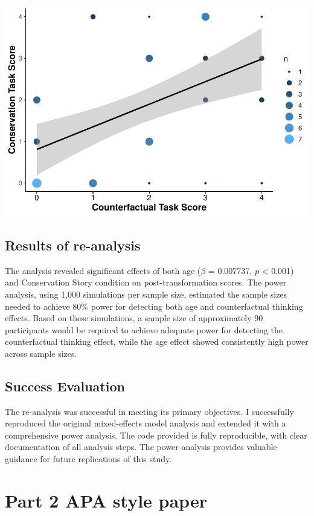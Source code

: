 \documentclass[
  doc]{apa6}
\begin{document}
\includegraphics{final_project_files/figure-latex/unnamed-chunk-8-1.pdf}

\subsection{Results of re-analysis}\label{results-of-re-analysis}

The analysis revealed significant effects of both age (\(\beta\) = 0.007737, \(p\) \textless{} 0.001) and Conservation Story condition on post-transformation scores.
The power analysis, using 1,000 simulations per sample size, estimated the sample sizes needed to achieve 80\% power for detecting both age and counterfactual thinking effects.
Based on these simulations, a sample size of approximately 90 participants would be required to achieve adequate power for detecting the counterfactual thinking effect, while the age effect showed consistently high power across sample sizes.

\subsection{Success Evaluation}\label{success-evaluation}

The re-analysis was successful in meeting its primary objectives.
I successfully reproduced the original mixed-effects model analysis and extended it with a comprehensive power analysis.
The code provided is fully reproducible, with clear documentation of all analysis steps.
The power analysis provides valuable guidance for future replications of this study.

\section{Part 2 APA style paper}\label{part-2-apa-style-paper}
\end{document}
